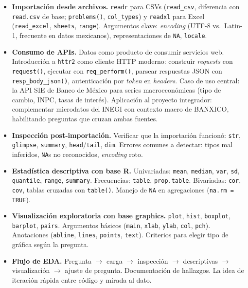 \documentclass[11pt,letterpaper]{article}
\newcommand{\blue}[1]{{\color{cerulean}#1}}
\newcommand{\orange}[1]{{\color{redorange}#1}}
\begin{document}
\begin{itemize}[leftmargin=*, itemsep=2pt]
    \item \textbf{Importación desde archivos.} \texttt{readr} para CSVs (\texttt{read\_csv}, diferencia con \texttt{read.csv} de base; \texttt{problems()}, \texttt{col\_types}) y \texttt{readxl} para Excel (\texttt{read\_excel}, \texttt{sheets}, \texttt{range}). Argumentos clave: \textit{encoding} (UTF-8 vs.\ Latin-1, frecuente en datos mexicanos), representaciones de \texttt{NA}, \texttt{locale}.
    \item \textbf{Consumo de APIs.} Datos como producto de consumir servicios web. Introducción a \texttt{httr2} como cliente HTTP moderno: construir \textit{requests} con \texttt{request()}, ejecutar con \texttt{req\_perform()}, parsear respuestas JSON con \texttt{resp\_body\_json()}, autenticación por \textit{token} en \textit{headers}. Caso de uso central: la \blue{API SIE de Banco de México} para series macroeconómicas (tipo de cambio, INPC, tasas de interés). Aplicación al proyecto integrador: complementar microdatos del INEGI con contexto macro de BANXICO, habilitando preguntas que cruzan ambas fuentes.
    \item \textbf{Inspección post-importación.} Verificar que la importación funcionó: \texttt{str}, \texttt{glimpse}, \texttt{summary}, \texttt{head}/\texttt{tail}, \texttt{dim}. Errores comunes a detectar: tipos mal inferidos, \texttt{NA}s no reconocidos, \textit{encoding} roto.
    \item \textbf{Estadística descriptiva con base R.} Univariadas: \texttt{mean}, \texttt{median}, \texttt{var}, \texttt{sd}, \texttt{quantile}, \texttt{range}, \texttt{summary}. Frecuencias: \texttt{table}, \texttt{prop.table}. Bivariadas: \texttt{cor}, \texttt{cov}, tablas cruzadas con \texttt{table()}. Manejo de \texttt{NA} en agregaciones (\texttt{na.rm = TRUE}).
    \item \textbf{Visualización exploratoria con base graphics.} \texttt{plot}, \texttt{hist}, \texttt{boxplot}, \texttt{barplot}, \texttt{pairs}. Argumentos básicos (\texttt{main}, \texttt{xlab}, \texttt{ylab}, \texttt{col}, \texttt{pch}). Anotaciones (\texttt{abline}, \texttt{lines}, \texttt{points}, \texttt{text}). Criterios para elegir tipo de gráfica según la pregunta.
    \item \textbf{Flujo de EDA.} Pregunta $\to$ carga $\to$ inspección $\to$ descriptivas $\to$ visualización $\to$ ajuste de pregunta. Documentación de hallazgos. La idea de \orange{iteración rápida} entre código y mirada al dato.
\end{itemize}
\end{document}
